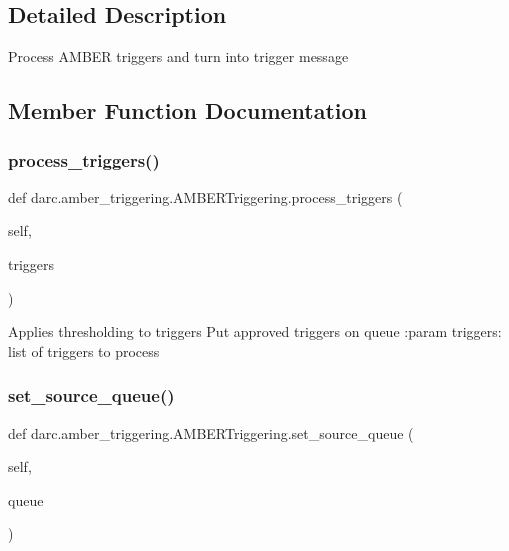 \subsection{Detailed Description}
\begin{DoxyVerb}Process AMBER triggers and turn into trigger message
\end{DoxyVerb}
 

\subsection{Member Function Documentation}
\mbox{\label{classdarc_1_1amber__triggering_1_1_a_m_b_e_r_triggering_a3f2d8d1a8da7fad98b6ef115397aab79}} 
\subsubsection{\texorpdfstring{process\_triggers()}{process\_triggers()}}
{\footnotesize\ttfamily def darc.\+amber\+\_\+triggering.\+A\+M\+B\+E\+R\+Triggering.\+process\+\_\+triggers (\begin{DoxyParamCaption}\item[{}]{self,  }\item[{}]{triggers }\end{DoxyParamCaption})}

\begin{DoxyVerb}Applies thresholding to triggers
Put approved triggers on queue
:param triggers: list of triggers to process
\end{DoxyVerb}
 \mbox{\label{classdarc_1_1amber__triggering_1_1_a_m_b_e_r_triggering_a645bbe2b862d0e1818d260d1111b7eb6}} 
\subsubsection{\texorpdfstring{set\_source\_queue()}{set\_source\_queue()}}
{\footnotesize\ttfamily def darc.\+amber\+\_\+triggering.\+A\+M\+B\+E\+R\+Triggering.\+set\+\_\+source\+\_\+queue (\begin{DoxyParamCaption}\item[{}]{self,  }\item[{}]{queue }\end{DoxyParamCaption})}

